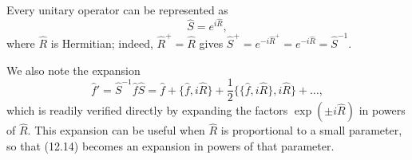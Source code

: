 Every unitary operator can be represented as
\begin{equation}
 \hat S=e^{i\hat R},
 \tag{12.13}
\end{equation}
where $\hat R$ is Hermitian; indeed, $\hat R^+=\hat R$ gives
$\hat S^+=e^{-i\hat R^+}=e^{-i\hat R}=\hat S^{-1}$.

We also note the expansion
\begin{equation}
 \hat f'=\hat S^{-1}\hat f\hat S
 =\hat f+\{\hat f,i\hat R\}
 +\frac12\{\{\hat f,i\hat R\},i\hat R\}+\ldots,
 \tag{12.14}
\end{equation}
which is readily verified directly by expanding the factors
$\exp(\pm i\hat R)$ in powers of $\hat R$. This expansion can be useful when
$\hat R$ is proportional to a small parameter, so that (12.14) becomes an
expansion in powers of that parameter.
